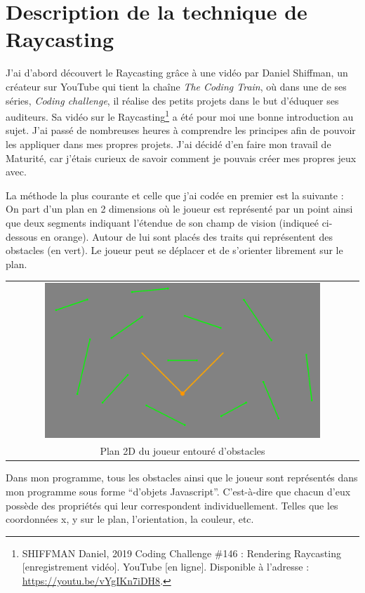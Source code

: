 \documentclass[11pt,french,a4paper,]{article}
\begin{document}
\hypertarget{description-de-la-technique-de-raycasting}{%
\section{Description de la technique de
Raycasting}\label{description-de-la-technique-de-raycasting}}

J'ai d'abord découvert le Raycasting grâce à une vidéo par Daniel
Shiffman, un créateur sur YouTube qui tient la chaîne \emph{The Coding
Train}, où dans une de ses séries, \emph{Coding challenge}, il réalise
des petits projets dans le but d'éduquer ses auditeurs. Sa vidéo sur le
Raycasting\footnote{SHIFFMAN Daniel, 2019 Coding Challenge \#146 :
  Rendering Raycasting {[}enregistrement vidéo{]}. YouTube {[}en
  ligne{]}. Disponible à l'adresse : \url{https://youtu.be/vYgIKn7iDH8}.}
a été pour moi une bonne introduction au sujet. J'ai passé de nombreuses
heures à comprendre les principes afin de pouvoir les appliquer dans mes
propres projets. J'ai décidé d'en faire mon travail de Maturité, car
j'étais curieux de savoir comment je pouvais créer mes propres jeux
avec.

La méthode la plus courante et celle que j'ai codée en premier est la
suivante : On part d'un plan en 2 dimensions où le joueur est représenté
par un point ainsi que deux segments indiquant l'étendue de son champ de
vision (indiqueé ci-dessous en orange). Autour de lui sont placés des
traits qui représentent des obstacles (en vert). Le joueur peut se
déplacer et de s'orienter librement sur le plan.

\begin{longtable}[]{@{}c@{}}
\toprule
\endhead
\includegraphics[width=0.8\textwidth,height=\textheight]{../img/Basic_level_player.png}\tabularnewline
Plan 2D du joueur entouré d'obstacles\tabularnewline
\bottomrule
\end{longtable}

Dans mon programme, tous les obstacles ainsi que le joueur sont
représentés dans mon programme sous forme ``d'objets Javascript''.
C'est-à-dire que chacun d'eux possède des propriétés qui leur
correspondent individuellement. Telles que les coordonnées x, y sur le
plan, l'orientation, la couleur, etc.
\end{document}
